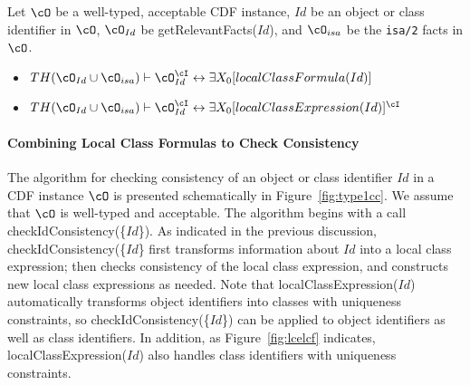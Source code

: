 \begin{lemma} \label{lem:localce}
Let $\cO$ be a well-typed, acceptable CDF instance, $Id$ be an object
or class identifier in $\cO$, $\cO_{Id}$ be {\sf
getRelevantFacts($Id$)}, and $\cO_{isa}$ be the {\tt isa/2} facts
in $\cO$.
\begin{itemize}
\item $TH(\cO_{Id} \cup \cO_{isa}) \vdash \cO_{Id}^{\cI}
\leftrightarrow \exists X_0 [localClassFormula(Id)] $
\item 
$TH(\cO_{Id} \cup \cO_{isa}) \vdash \cO_{Id}^{\cI}
\leftrightarrow \exists X_0[localClassExpression(Id)]^{\cI}$
\end{itemize}
\end{lemma}

\paragraph*{Combining Local Class Formulas to Check Consistency}
The algorithm for checking consistency of an object or class
identifier $Id$ in a CDF instance $\cO$ is presented schematically in
Figure~\ref{fig:type1cc}.  We assume that $\cO$ is well-typed and
acceptable.  The algorithm begins with a call {\sf
checkIdConsistency(\{$Id$\})}.  As indicated in the previous
discussion, {\sf checkIdConsistency(\{$Id$\}} first transforms
information about $Id$ into a local class expression; then checks
consistency of the local class expression, and constructs new local
class expressions as needed.  Note that {\sf
localClassExpression($Id$)} automatically transforms object
identifiers into classes with uniqueness constraints, so {\sf
checkIdConsistency(\{$Id$\})} can be applied to object identifiers as
well as class identifiers.  In addition, as Figure~\ref{fig:lcelcf}
indicates, {\sf localClassExpression($Id$)} also handles class
identifiers with uniqueness constraints.

